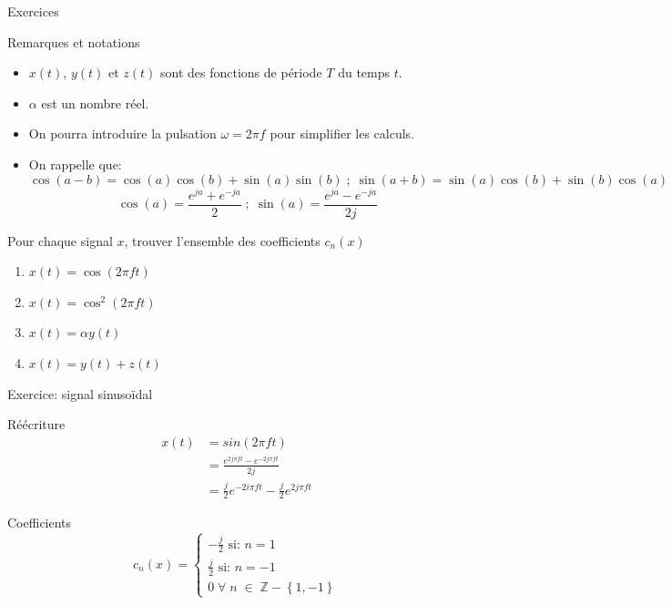 \documentclass[8pt,a4paper]{beamer}
\begin{document}
\begin{frame}{Exercices}
\begin{block}{Remarques et notations}
\begin{itemize}
\item $x(t)$, $y(t)$ et $z(t)$ sont des fonctions de période $T$ du temps $t$.
\item $\alpha$ est un nombre réel.
\item On pourra introduire la pulsation $\omega=2\pi f$ pour simplifier les calculs.
\item On rappelle que:
$$
\cos(a-b) = \cos(a)\cos(b)+\sin(a)\sin(b)\; ; \; \sin(a+b)=\sin(a)\cos(b)+\sin(b)\cos(a)
$$
$$
\cos(a) = \frac{e^{ja}+e^{-ja}}{2}\; ; \;\sin(a) = \frac{e^{ja}-e^{-ja}}{2j}
$$
\end{itemize}
\end{block}

\begin{block}{Pour chaque signal $x$, trouver l'ensemble des coefficients $c_n(x)$}
\begin{enumerate}
\item $x(t) = \cos (2\pi f t)$
\item $x(t) = \cos^2(2\pi ft)$
\item $x(t) = \alpha y(t)$
\item $x(t) = y(t)+z(t)$
\end{enumerate}
\end{block}
\end{frame}

\begin{frame}{Exercice: signal sinusoïdal}
\begin{block}{Réécriture}
\begin{align}
x(t) & = sin(2\pi ft) \nonumber \\
& = \frac{e^{2j\pi ft}- e^{-2j\pi ft}}{2j} \nonumber\\
& = \frac{j}{2}e^{-2i\pi ft} -\frac{j}{2}e^{2j\pi ft} \nonumber
\end{align}
\end{block}
\begin{alertblock}{Coefficients}
$$
c_n(x) = \left\{
\begin{split}
-\frac{j}{2}\mbox{ si: }n=1\\
\frac{j}{2}\mbox{ si: }n=-1\\
0 \; \forall\;  n \;\in \;\mathbb{Z} -\left\{1,-1\right\} 
\end{split}
\right.
$$
\end{alertblock}
\end{frame}
\end{document}
